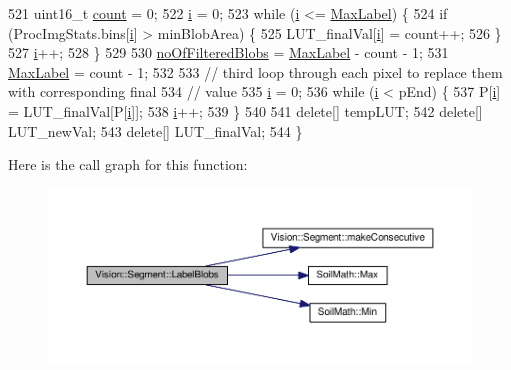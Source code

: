 \begin{DoxyCode}
521   uint16\_t \hyperlink{_comparision_pictures_2_createtest_image_8m_ae11b3deb3de3df7dc48e439074023e35}{count} = 0;
522   \hyperlink{_comparision_pictures_2_createtest_image_8m_a6f6ccfcf58b31cb6412107d9d5281426}{i} = 0;
523   \textcolor{keywordflow}{while} (\hyperlink{_comparision_pictures_2_createtest_image_8m_a6f6ccfcf58b31cb6412107d9d5281426}{i} <= \hyperlink{class_vision_1_1_segment_a22d2a688de65f4d25b164f8b2a03f4a9}{MaxLabel}) \{
524     \textcolor{keywordflow}{if} (ProcImgStats.bins[\hyperlink{_comparision_pictures_2_createtest_image_8m_a6f6ccfcf58b31cb6412107d9d5281426}{i}] > minBlobArea) \{
525       LUT\_finalVal[\hyperlink{_comparision_pictures_2_createtest_image_8m_a6f6ccfcf58b31cb6412107d9d5281426}{i}] = count++;
526     \}
527     \hyperlink{_comparision_pictures_2_createtest_image_8m_a6f6ccfcf58b31cb6412107d9d5281426}{i}++;
528   \}
529 
530   \hyperlink{class_vision_1_1_segment_a97077da3a144e800073bc06f5d4722d4}{noOfFilteredBlobs} = \hyperlink{class_vision_1_1_segment_a22d2a688de65f4d25b164f8b2a03f4a9}{MaxLabel} - count - 1;
531   \hyperlink{class_vision_1_1_segment_a22d2a688de65f4d25b164f8b2a03f4a9}{MaxLabel} = count - 1;
532 
533   \textcolor{comment}{// third loop through each pixel to replace them with corresponding final}
534   \textcolor{comment}{// value}
535   \hyperlink{_comparision_pictures_2_createtest_image_8m_a6f6ccfcf58b31cb6412107d9d5281426}{i} = 0;
536   \textcolor{keywordflow}{while} (\hyperlink{_comparision_pictures_2_createtest_image_8m_a6f6ccfcf58b31cb6412107d9d5281426}{i} < pEnd) \{
537     P[\hyperlink{_comparision_pictures_2_createtest_image_8m_a6f6ccfcf58b31cb6412107d9d5281426}{i}] = LUT\_finalVal[P[\hyperlink{_comparision_pictures_2_createtest_image_8m_a6f6ccfcf58b31cb6412107d9d5281426}{i}]];
538     \hyperlink{_comparision_pictures_2_createtest_image_8m_a6f6ccfcf58b31cb6412107d9d5281426}{i}++;
539   \}
540 
541   \textcolor{keyword}{delete}[] tempLUT;
542   \textcolor{keyword}{delete}[] LUT\_newVal;
543   \textcolor{keyword}{delete}[] LUT\_finalVal;
544 \}
\end{DoxyCode}


Here is the call graph for this function\+:\nopagebreak
\begin{figure}[H]
\begin{center}
\leavevmode
\includegraphics[width=350pt]{class_vision_1_1_segment_ac10de08f4c3b0f8cb91f0469b6cf37c9_cgraph}
\end{center}
\end{figure}




